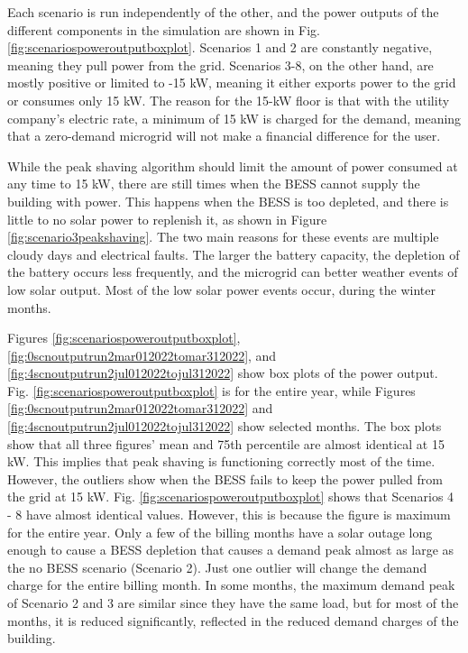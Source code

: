 \documentclass[conference]{IEEEtran}
\begin{document}
		Each scenario is run independently of the other, and the power outputs of the different components in the simulation are shown in Fig. \ref{fig:scenariospoweroutputboxplot}. Scenarios 1 and 2 are constantly negative, meaning they pull power from the grid. Scenarios 3-8, on the other hand, are mostly positive or limited to -15 kW, meaning it either exports power to the grid or consumes only 15 kW. The reason for the 15-kW floor is that with the utility company's electric rate, a minimum of 15 kW is charged for the demand, meaning that a zero-demand microgrid will not make a financial difference for the user. 
		
		While the peak shaving algorithm should limit the amount of power consumed at any time to 15 kW, there are still times when the BESS cannot supply the building with power. This happens when the BESS is too depleted, and there is little to no solar power to replenish it, as shown in Figure \ref{fig:scenario3peakshaving}. The two main reasons for these events are multiple cloudy days and electrical faults. The larger the battery capacity, the depletion of the battery occurs less frequently, and the microgrid can better weather events of low solar output. Most of the low solar power events occur, during the winter months.
		
		Figures \ref{fig:scenariospoweroutputboxplot}, \ref{fig:0scnoutputrun2mar012022tomar312022}, and \ref{fig:4scnoutputrun2jul012022tojul312022} show box plots of the power output. Fig. \ref{fig:scenariospoweroutputboxplot} is for the entire year, while Figures \ref{fig:0scnoutputrun2mar012022tomar312022} and \ref{fig:4scnoutputrun2jul012022tojul312022} show selected months. The box plots show that all three figures' mean and 75th percentile are almost identical at 15 kW. This implies that peak shaving is functioning correctly most of the time. However, the outliers show when the BESS fails to keep the power pulled from the grid at 15 kW. Fig. \ref{fig:scenariospoweroutputboxplot} shows that Scenarios 4 - 8 have almost identical values. However, this is because the figure is maximum for the entire year. Only a few of the billing months have a solar outage long enough to cause a BESS depletion that causes a demand peak almost as large as the no BESS scenario (Scenario 2). %
		Just one outlier will change the demand charge for the entire billing month. In some months, the maximum demand peak of Scenario 2 and 3 are similar since they have the same load, but for most of the months, it is reduced significantly, reflected in the reduced demand charges of the building.   %
		
\end{document}
